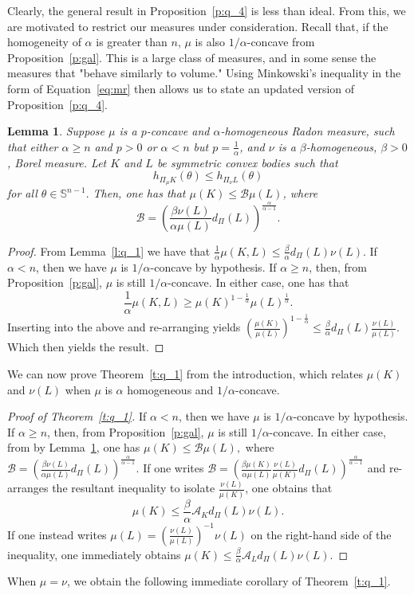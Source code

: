 \documentclass[11pt]{amsart}
\newtheorem{lemma}[theorem]{Lemma}
\theoremstyle{definition}
\theoremstyle{remark}
\numberwithin{equation}{section}
\newcommand{\s}{\mathbb{S}}
\begin{document}
Clearly, the general result in Proposition~\ref{p:q_4} is less than ideal. From this, we are motivated to restrict our measures under consideration. Recall that, if the homogeneity of $\alpha$ is greater than $n$, $\mu$ is also $1/\alpha$-concave from Proposition~\ref{p:gal}. This is a large class of measures, and in some sense the measures that "behave similarly to volume." Using Minkowski's inequality in the form of Equation~\ref{eq:mr} then allows us to state an updated version of Proposition~\ref{p:q_4}.
\begin{lemma}
\label{l:q_3}
Suppose $\mu$ is a $p$-concave and $\alpha$-homogeneous Radon measure, such that either $\alpha \geq n$ and $p>0$ or $\alpha<n$ but $p=\frac{1}{\alpha}$, and $\nu$ is a $\beta$-homogeneous, $\beta>0$, Borel measure. Let $K$ and $L$ be symmetric convex bodies such that
$$h_{\Pi_\mu K}(\theta)\leq h_{\Pi_\nu L}(\theta)$$ for all $\theta\in\s^{n-1}.$ Then, one has that $\mu(K)\leq\mathcal{B}\mu(L)$, where
$$\mathcal{B}=\left(\frac{\beta\nu(L)}{\alpha\mu(L)} d_{\Pi}(L)\right)^{\frac{\alpha}{\alpha-1}}.$$
\end{lemma}
\begin{proof}
From Lemma~\ref{l:q_1} we have that $\frac{1}{\alpha}\mu(K,L) \leq \frac{\beta}{\alpha} d_{\Pi}(L)\nu(L).$ If $\alpha<n$, then we have $\mu$ is $1/\alpha$-concave by hypothesis. If $\alpha\geq n$, then, from Proposition~\ref{p:gal}, $\mu$ is still $1/\alpha$-concave. In either case, one has that $$\frac{1}{\alpha}\mu(K,L)\geq \mu(K)^{1-\frac{1}{\alpha}} \mu(L)^{\frac{1}{\alpha}}.$$
Inserting into the above and re-arranging yields 
$\left(\frac{\mu(K)}{\mu(L)}\right)^{1-\frac{1}{\alpha}} \leq \frac{\beta}{\alpha} d_{\Pi}(L)\frac{\nu(L)}{\mu(L)}.$
Which then yields the result.
\end{proof}
We can now prove Theorem~\ref{t:q_1} from the introduction, which relates $\mu(K)$ and $\nu(L)$ when $\mu$ is $\alpha$ homogeneous and $1/\alpha$-concave.
\begin{proof}[Proof of Theorem~\ref{t:q_1}]
If $\alpha<n$, then we have $\mu$ is $1/\alpha$-concave by hypothesis. If $\alpha\geq n$, then, from Proposition~\ref{p:gal}, $\mu$ is still $1/\alpha$-concave. In either case, from by Lemma~\ref{l:q_3}, one has $\mu(K)\leq \mathcal{B}\mu(L),$ where $\mathcal{B}=\left(\frac{\beta\nu(L)}{\alpha\mu(L)} d_{\Pi}(L)\right)^{\frac{\alpha}{\alpha-1}}.$ If one writes $\mathcal{B}=\left(\frac{\beta\mu(K)}{\alpha\mu(L)}\frac{\nu(L)}{\mu(K)} d_{\Pi}(L)\right)^{\frac{\alpha}{\alpha-1}}$ and re-arranges the resultant inequality to isolate $\frac{\nu(L)}{\mu(K)}$, one obtains that $$\mu(K)\leq\frac{\beta}{\alpha}\mathcal{A}_K d_{\Pi}(L)\nu(L).$$ If one instead writes $\mu(L)=\left(\frac{\nu(L)}{\mu(L)}\right)^{-1}\nu(L)$ on the right-hand side of the inequality, one immediately obtains $\mu(K)\leq\frac{\beta}{\alpha}\mathcal{A}_Ld_{\Pi}(L)\nu(L)$.
\end{proof} When $\mu=\nu$, we obtain the following immediate corollary of Theorem~\ref{t:q_1}.
\end{document}
